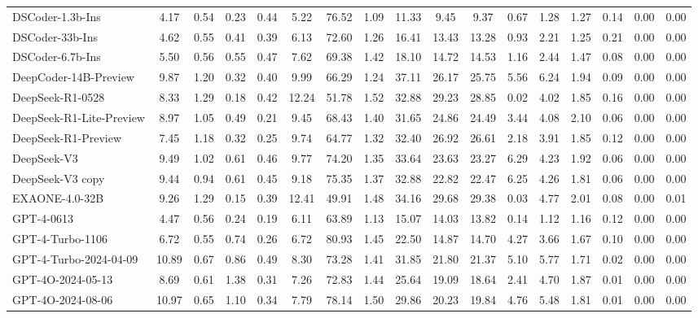\begin{table}[t]
{\begin{tabular}{|l|cccc|cc|cccccc|ccc|c|}
DSCoder-1.3b-Ins & 4.17 & 0.54 & 0.23 & 0.44 & 5.22 & 76.52 & 1.09 & 11.33 & 9.45 & 9.37 & 0.67 & 1.28 & 1.27 & 0.14 & 0.00 & 0.00 \\
DSCoder-33b-Ins & 4.62 & 0.55 & 0.41 & 0.39 & 6.13 & 72.60 & 1.26 & 16.41 & 13.43 & 13.28 & 0.93 & 2.21 & 1.25 & 0.21 & 0.00 & 0.00 \\
DSCoder-6.7b-Ins & 5.50 & 0.56 & 0.55 & 0.47 & 7.62 & 69.38 & 1.42 & 18.10 & 14.72 & 14.53 & 1.16 & 2.44 & 1.47 & 0.08 & 0.00 & 0.00 \\
DeepCoder-14B-Preview & 9.87 & 1.20 & 0.32 & 0.40 & 9.99 & 66.29 & 1.24 & 37.11 & 26.17 & 25.75 & 5.56 & 6.24 & 1.94 & 0.09 & 0.00 & 0.00 \\
DeepSeek-R1-0528 & 8.33 & 1.29 & 0.18 & 0.42 & 12.24 & 51.78 & 1.52 & 32.88 & 29.23 & 28.85 & 0.02 & 4.02 & 1.85 & 0.16 & 0.00 & 0.00 \\
DeepSeek-R1-Lite-Preview & 8.97 & 1.05 & 0.49 & 0.21 & 9.45 & 68.43 & 1.40 & 31.65 & 24.86 & 24.49 & 3.44 & 4.08 & 2.10 & 0.06 & 0.00 & 0.00 \\
DeepSeek-R1-Preview & 7.45 & 1.18 & 0.32 & 0.25 & 9.74 & 64.77 & 1.32 & 32.40 & 26.92 & 26.61 & 2.18 & 3.91 & 1.85 & 0.12 & 0.00 & 0.00 \\
DeepSeek-V3 & 9.49 & 1.02 & 0.61 & 0.46 & 9.77 & 74.20 & 1.35 & 33.64 & 23.63 & 23.27 & 6.29 & 4.23 & 1.92 & 0.06 & 0.00 & 0.00 \\
DeepSeek-V3 copy & 9.44 & 0.94 & 0.61 & 0.45 & 9.18 & 75.35 & 1.37 & 32.88 & 22.82 & 22.47 & 6.25 & 4.26 & 1.81 & 0.06 & 0.00 & 0.00 \\
EXAONE-4.0-32B & 9.26 & 1.29 & 0.15 & 0.39 & 12.41 & 49.91 & 1.48 & 34.16 & 29.68 & 29.38 & 0.03 & 4.77 & 2.01 & 0.08 & 0.00 & 0.01 \\
GPT-4-0613 & 4.47 & 0.56 & 0.24 & 0.19 & 6.11 & 63.89 & 1.13 & 15.07 & 14.03 & 13.82 & 0.14 & 1.12 & 1.16 & 0.12 & 0.00 & 0.00 \\
GPT-4-Turbo-1106 & 6.72 & 0.55 & 0.74 & 0.26 & 6.72 & 80.93 & 1.45 & 22.50 & 14.87 & 14.70 & 4.27 & 3.66 & 1.67 & 0.10 & 0.00 & 0.00 \\
GPT-4-Turbo-2024-04-09 & 10.89 & 0.67 & 0.86 & 0.49 & 8.30 & 73.28 & 1.41 & 31.85 & 21.80 & 21.37 & 5.10 & 5.77 & 1.71 & 0.02 & 0.00 & 0.00 \\
GPT-4O-2024-05-13 & 8.69 & 0.61 & 1.38 & 0.31 & 7.26 & 72.83 & 1.44 & 25.64 & 19.09 & 18.64 & 2.41 & 4.70 & 1.87 & 0.01 & 0.00 & 0.00 \\
GPT-4O-2024-08-06 & 10.97 & 0.65 & 1.10 & 0.34 & 7.79 & 78.14 & 1.50 & 29.86 & 20.23 & 19.84 & 4.76 & 5.48 & 1.81 & 0.01 & 0.00 & 0.00 \\

\end{tabular}}
\end{table}

